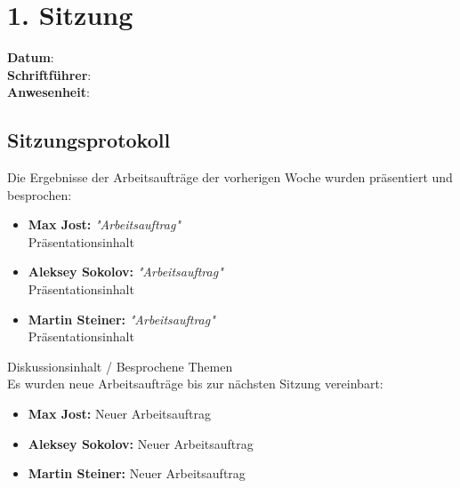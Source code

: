 \section{1. Sitzung}
\label{sec:1_sitzung}

\textbf{Datum}:\\
\textbf{Schriftführer}:\\
\textbf{Anwesenheit}: 

\subsection*{Sitzungsprotokoll}

Die Ergebnisse der Arbeitsaufträge der vorherigen Woche wurden präsentiert und besprochen:
\begin{itemize}
    \item \textbf{Max Jost:} \textit{"Arbeitsauftrag"}\\
    Präsentationsinhalt
    \item \textbf{Aleksey Sokolov:} \textit{"Arbeitsauftrag"}\\
    Präsentationsinhalt
    \item \textbf{Martin Steiner:} \textit{"Arbeitsauftrag"}\\
    Präsentationsinhalt
\end{itemize}

Diskussionsinhalt / Besprochene Themen \\


Es wurden neue Arbeitsaufträge bis zur nächsten Sitzung vereinbart:

\begin{itemize}
    \item \textbf{Max Jost:} Neuer Arbeitsauftrag
    \item \textbf{Aleksey Sokolov:} Neuer Arbeitsauftrag
    \item \textbf{Martin Steiner:} Neuer Arbeitsauftrag
\end{itemize}

\newpage